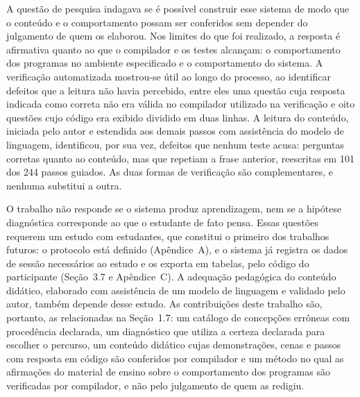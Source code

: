 A questão de pesquisa indagava se é possível construir esse sistema de modo que o conteúdo e o comportamento possam ser conferidos sem depender do julgamento de quem os elaborou. Nos limites do que foi realizado, a resposta é afirmativa quanto ao que o compilador e os testes alcançam: o comportamento dos programas no ambiente especificado e o comportamento do sistema. A verificação automatizada mostrou-se útil ao longo do processo, ao identificar defeitos que a leitura não havia percebido, entre eles uma questão cuja resposta indicada como correta não era válida no compilador utilizado na verificação e oito questões cujo código era exibido dividido em duas linhas. A leitura do conteúdo, iniciada pelo autor e estendida aos demais passos com assistência do modelo de linguagem, identificou, por sua vez, defeitos que nenhum teste acusa: perguntas corretas quanto ao conteúdo, mas que repetiam a frase anterior, reescritas em 101 dos 244 passos guiados. As duas formas de verificação são complementares, e nenhuma substitui a outra.

O trabalho não responde se o sistema produz aprendizagem, nem se a hipótese diagnóstica corresponde ao que o estudante de fato pensa. Essas questões requerem um estudo com estudantes, que constitui o primeiro dos trabalhos futuros: o protocolo está definido (Apêndice~A), e o sistema já registra os dados de sessão necessários ao estudo e os exporta em tabelas, pelo código do participante (Seção~3.7 e Apêndice~C). A adequação pedagógica do conteúdo didático, elaborado com assistência de um modelo de linguagem e validado pelo autor, também depende desse estudo. As contribuições deste trabalho são, portanto, as relacionadas na Seção~1.7: um catálogo de concepções errôneas com procedência declarada, um diagnóstico que utiliza a certeza declarada para escolher o percurso, um conteúdo didático cujas demonstrações, cenas e passos com resposta em código são conferidos por compilador e um método no qual as afirmações do material de ensino sobre o comportamento dos programas são verificadas por compilador, e não pelo julgamento de quem as redigiu.
